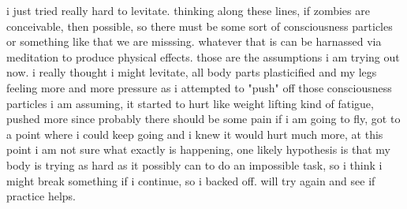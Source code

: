 \documentclass[12pt]{article}
\begin{document}
i just tried really hard to levitate.  thinking along these lines, if zombies are conceivable, then possible, so there must be some sort of consciousness particles
or something like that we are misssing.  whatever that is can be harnassed via meditation to produce physical effects.  those are the assumptions i am trying
out now.  i really thought i might levitate, all body parts plasticified and my legs feeling more and more pressure as i attempted to "push" off
those consciousness particles i am assuming, it started to hurt like weight lifting kind of fatigue, pushed more since probably there should be some
pain if i am going to fly, got to a point where i could keep going and i knew it would hurt much more, at this point i am not sure what exactly is happening,
one likely hypothesis is that my body is trying as hard as it possibly can to do an impossible task, so i think i might break something if i
continue, so i backed off.  will try again and see if practice helps.
\end{document}
